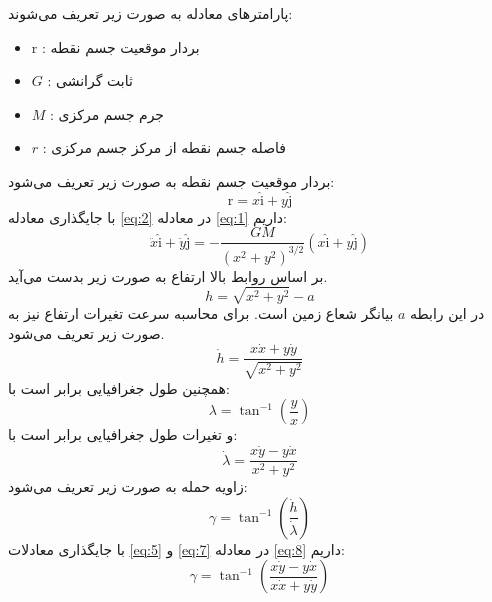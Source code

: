 پارامترهای معادله به صورت زیر تعریف می‌شوند:
\begin{itemize}
    \item $\boldsymbol{\mathrm{r}}$ : بردار موقعیت جسم نقطه
    \item $G$ : ثابت گرانشی
    \item $M$ : جرم جسم مرکزی
    \item $r$ : فاصله جسم نقطه از مرکز جسم مرکزی
\end{itemize}
بردار موقعیت جسم نقطه به صورت زیر تعریف می‌شود:
\begin{equation}
    \label{eq:2}
    \boldsymbol{\mathrm{r}} = x\hat{\boldsymbol{\mathrm{i}}} + y\hat{\boldsymbol{\mathrm{j}}}
\end{equation}
با جایگذاری معادله \eqref{eq:2} در معادله \eqref{eq:1} داریم:
\begin{equation}
    \label{eq:3}
    \ddot{x}\hat{\boldsymbol{\mathrm{i}}} + \ddot{y}\hat{\boldsymbol{\mathrm{j}}} = -\dfrac{GM}{(x^2 + y^2)^{3/2}}(x\hat{\boldsymbol{\mathrm{i}}} + y\hat{\boldsymbol{\mathrm{j}}})
\end{equation}
بر اساس روابط بالا ارتفاع به صورت زیر بدست می‌آید.
\begin{equation}
    \label{eq:4}
    h =\sqrt{x^2 + y^2} - a
\end{equation}
در این رابطه $a$ بیانگر شعاع زمین است. برای محاسبه سرعت 
تغیرات ارتفاع نیز به صورت زیر تعریف می‌شود.
\begin{equation}
    \label{eq:5}
    \dot{h} = \dfrac{x\dot{x} + y\dot{y}}{\sqrt{x^2 + y^2}}
\end{equation}
همچنین طول جغرافیایی برابر است با:
\begin{equation}
    \label{eq:6}
    \lambda = \tan^{-1}\left(\dfrac{y}{x}\right)
\end{equation}
و تغیرات طول جغرافیایی برابر است با:
\begin{equation}
    \label{eq:7}
    \dot{\lambda} = \dfrac{x\dot{y} - y\dot{x}}{x^2 + y^2}
\end{equation}
زاویه حمله به صورت زیر تعریف می‌شود:
\begin{equation}
    \label{eq:8}
    \gamma = \tan^{-1}\left(\dfrac{\dot{h}}{\dot{\lambda}}\right)
\end{equation}
با جایگذاری معادلات \eqref{eq:5} و \eqref{eq:7} در معادله \eqref{eq:8} داریم:
\begin{equation}
    \label{eq:9}
    \gamma = \tan^{-1}\left(\dfrac{x\dot{y} - y\dot{x}}{x\dot{x} + y\dot{y}}\right)
\end{equation}


